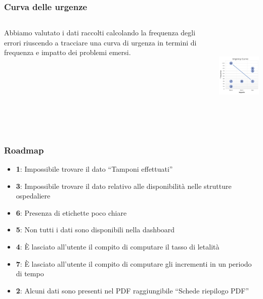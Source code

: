 \documentclass[handout]{beamer}
\begin{document}
			\begin{frame}
				\frametitle{Curva delle urgenze}
				\begin{columns}[t]
					\begin{column}[T]{5cm}
						Abbiamo valutato i dati raccolti calcolando la frequenza degli errori riuscendo a tracciare una curva di urgenza in termini di frequenza e impatto dei problemi emersi.
					\end{column}
					\begin{column}[T]{5cm}
						\includegraphics[height=5cm]{img/urgency_curve}
					\end{column}
				\end{columns}
			\end{frame}
		 
			\begin{frame}
				\frametitle{Roadmap}
				\begin{itemize}[<+->]
					\item \textbf{1}: Impossibile trovare il dato ``Tamponi effettuati''\\
					\item \textbf{3}: Impossibile trovare il dato relativo alle disponibilità nelle strutture ospedaliere\\
					\item \textbf{6}: Presenza di etichette poco chiare\\
					\item \textbf{5}: Non tutti i dati sono disponibili nella dashboard
					\item \textbf{4}: \`E lasciato all'utente il compito di computare il tasso di letalità\\
					\item \textbf{7}: \`E lasciato all'utente il compito di computare gli incrementi in un periodo di tempo\\
					\item \textbf{2}: Alcuni dati sono presenti nel PDF raggiungibile ``Schede riepilogo PDF''\\
				\end{itemize}
			\end{frame}
\end{document}
